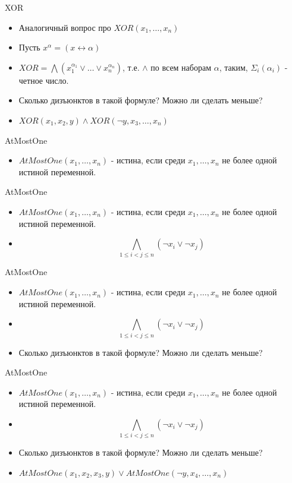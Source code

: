 \documentclass{beamer}
\begin{document}
\begin{frame}{XOR}
\begin{itemize}
\item Аналогичный вопрос про $XOR(x_1, \dots, x_n)$
\item Пусть $x^{\alpha} = (x \leftrightarrow \alpha)$
\item $XOR = \bigwedge(x_1^{\alpha_1} \vee \dots \vee x_n^{\alpha_n})$, т.е. $\wedge$ по всем наборам $\alpha$, таким,
$\Sigma_i(\alpha_i)$ - четное число.
\item Сколько дизъюнктов в такой формуле? Можно ли сделать меньше?
\item $XOR(x_1, x_2, y) \wedge XOR(\lnot y, x_3, \dots, x_n)$
\end{itemize}
\end{frame}

\begin{frame}{AtMostOne}
\begin{itemize}
\item $AtMostOne(x_1, \dots, x_n)$ - истина, если среди $x_1, \dots, x_n$ не более одной истиной переменной.
\end{itemize}
\end{frame}

\begin{frame}{AtMostOne}
\begin{itemize}
\item $AtMostOne(x_1, \dots, x_n)$ - истина, если среди $x_1, \dots, x_n$ не более одной истиной переменной.
\item \[\bigwedge_{1 \le i < j \le n}(\lnot x_i \vee \lnot x_j)\]
\end{itemize}
\end{frame}

\begin{frame}{AtMostOne}
\begin{itemize}
\item $AtMostOne(x_1, \dots, x_n)$ - истина, если среди $x_1, \dots, x_n$ не более одной истиной переменной.
\item \[\bigwedge_{1 \le i < j \le n}(\lnot x_i \vee \lnot x_j)\]
\item Сколько дизъюнктов в такой формуле? Можно ли сделать меньше?
\end{itemize}
\end{frame}

\begin{frame}{AtMostOne}
\begin{itemize}
\item $AtMostOne(x_1, \dots, x_n)$ - истина, если среди $x_1, \dots, x_n$ не более одной истиной переменной.
\item \[\bigwedge_{1 \le i < j \le n}(\lnot x_i \vee \lnot x_j)\]
\item Сколько дизъюнктов в такой формуле? Можно ли сделать меньше?
\item $AtMostOne(x_1, x_2, x_3, y) \vee AtMostOne(\lnot y, x_4, \dots, x_n)$
\end{itemize}
\end{frame}
\end{document}
